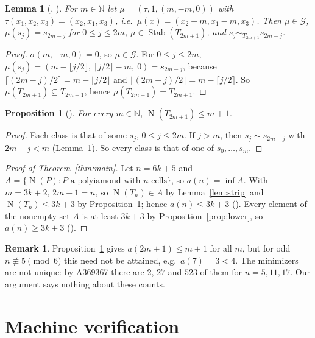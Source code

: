 \documentclass[11pt]{amsart}
\theoremstyle{plain}
\newtheorem{lemma}[theorem]{Lemma}
\newtheorem{proposition}[theorem]{Proposition}
\theoremstyle{definition}
\newtheorem{remark}[theorem]{Remark}
\newcommand{\N}{\mathbb{N}}
\newcommand{\G}{\mathcal{G}}
\newcommand{\Stab}{\operatorname{Stab}}
\newcommand{\cls}{\operatorname{N}}
\begin{document}
\begin{lemma}[, ]\label{lem:mirror}
For $m\in\N$ let $\mu=(\tau,1,(m,-m,0))$ with $\tau(x_1,x_2,x_3)=(x_2,x_1,x_3)$, i.e.\ $\mu(x)=(x_2+m,x_1-m,x_3)$. Then $\mu\in\G$, $\mu(s_j)=s_{2m-j}$ for $0\le j\le 2m$, $\mu\in\Stab(T_{2m+1})$, and $s_j\sim_{T_{2m+1}}s_{2m-j}$.
\end{lemma}

\begin{proof}
$\sigma(m,-m,0)=0$, so $\mu\in\G$. For $0\le j\le2m$, $\mu(s_j)=(m-\lfloor j/2\rfloor,\ \lceil j/2\rceil-m,\ 0)=s_{2m-j}$, because $\lceil(2m-j)/2\rceil=m-\lfloor j/2\rfloor$ and $\lfloor(2m-j)/2\rfloor=m-\lceil j/2\rceil$. So $\mu(T_{2m+1})\subseteq T_{2m+1}$, hence $\mu(T_{2m+1})=T_{2m+1}$.
\end{proof}

\begin{proposition}[]\label{prop:upper}
For every $m\in\N$, $\cls(T_{2m+1})\le m+1$.
\end{proposition}

\begin{proof}
Each class is that of some $s_j$, $0\le j\le 2m$. If $j>m$, then $s_j\sim s_{2m-j}$ with $2m-j<m$ (Lemma~\ref{lem:mirror}). So every class is that of one of $s_0,\dots,s_m$.
\end{proof}

\begin{proof}[Proof of Theorem~\ref{thm:main}]
Let $n=6k+5$ and $A=\{\cls(P):P\text{ a polyiamond with $n$ cells}\}$, so $a(n)=\inf A$. With $m=3k+2$, $2m+1=n$, so $\cls(T_n)\in A$ by Lemma~\ref{lem:strip} and $\cls(T_n)\le3k+3$ by Proposition~\ref{prop:upper}; hence $a(n)\le3k+3$ (). Every element of the nonempty set $A$ is at least $3k+3$ by Proposition~\ref{prop:lower}, so $a(n)\ge3k+3$ ().
\end{proof}

\begin{remark}
Proposition~\ref{prop:upper} gives $a(2m+1)\le m+1$ for all $m$, but for odd $n\not\equiv5\pmod6$ this need not be attained, e.g.\ $a(7)=3<4$. The minimizers are not unique: by A369367 there are $2$, $27$ and $523$ of them for $n=5,11,17$. Our argument says nothing about these counts.
\end{remark}

\section{Machine verification}\label{sec:lean}
\end{document}
